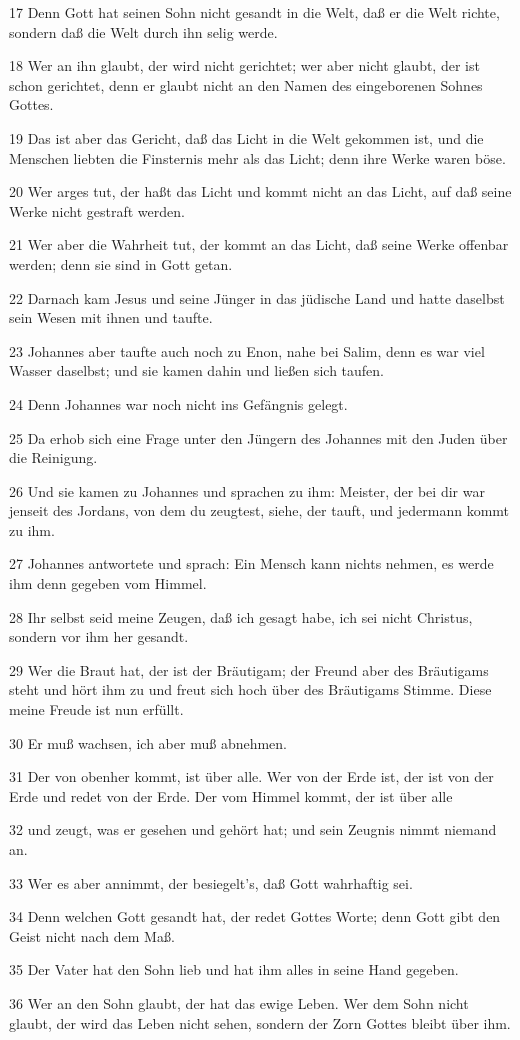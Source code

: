 \par 17 Denn Gott hat seinen Sohn nicht gesandt in die Welt, daß er die Welt richte, sondern daß die Welt durch ihn selig werde.
\par 18 Wer an ihn glaubt, der wird nicht gerichtet; wer aber nicht glaubt, der ist schon gerichtet, denn er glaubt nicht an den Namen des eingeborenen Sohnes Gottes.
\par 19 Das ist aber das Gericht, daß das Licht in die Welt gekommen ist, und die Menschen liebten die Finsternis mehr als das Licht; denn ihre Werke waren böse.
\par 20 Wer arges tut, der haßt das Licht und kommt nicht an das Licht, auf daß seine Werke nicht gestraft werden.
\par 21 Wer aber die Wahrheit tut, der kommt an das Licht, daß seine Werke offenbar werden; denn sie sind in Gott getan.
\par 22 Darnach kam Jesus und seine Jünger in das jüdische Land und hatte daselbst sein Wesen mit ihnen und taufte.
\par 23 Johannes aber taufte auch noch zu Enon, nahe bei Salim, denn es war viel Wasser daselbst; und sie kamen dahin und ließen sich taufen.
\par 24 Denn Johannes war noch nicht ins Gefängnis gelegt.
\par 25 Da erhob sich eine Frage unter den Jüngern des Johannes mit den Juden über die Reinigung.
\par 26 Und sie kamen zu Johannes und sprachen zu ihm: Meister, der bei dir war jenseit des Jordans, von dem du zeugtest, siehe, der tauft, und jedermann kommt zu ihm.
\par 27 Johannes antwortete und sprach: Ein Mensch kann nichts nehmen, es werde ihm denn gegeben vom Himmel.
\par 28 Ihr selbst seid meine Zeugen, daß ich gesagt habe, ich sei nicht Christus, sondern vor ihm her gesandt.
\par 29 Wer die Braut hat, der ist der Bräutigam; der Freund aber des Bräutigams steht und hört ihm zu und freut sich hoch über des Bräutigams Stimme. Diese meine Freude ist nun erfüllt.
\par 30 Er muß wachsen, ich aber muß abnehmen.
\par 31 Der von obenher kommt, ist über alle. Wer von der Erde ist, der ist von der Erde und redet von der Erde. Der vom Himmel kommt, der ist über alle
\par 32 und zeugt, was er gesehen und gehört hat; und sein Zeugnis nimmt niemand an.
\par 33 Wer es aber annimmt, der besiegelt's, daß Gott wahrhaftig sei.
\par 34 Denn welchen Gott gesandt hat, der redet Gottes Worte; denn Gott gibt den Geist nicht nach dem Maß.
\par 35 Der Vater hat den Sohn lieb und hat ihm alles in seine Hand gegeben.
\par 36 Wer an den Sohn glaubt, der hat das ewige Leben. Wer dem Sohn nicht glaubt, der wird das Leben nicht sehen, sondern der Zorn Gottes bleibt über ihm.


